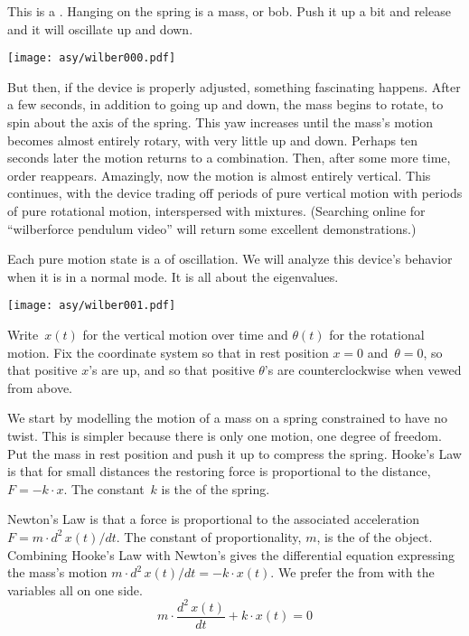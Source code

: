 
% 

This is a .
Hanging on the spring is a mass, or bob.
Push it up a bit and release and it will oscillate up and down.
\begin{center}
  \texttt{[image: asy/wilber000.pdf]}
\end{center}
But then, if the device is properly adjusted, something fascinating happens.
After a few seconds, in addition to going up
and down, the mass begins to rotate,
to spin about the axis of the spring.
This yaw increases until the mass's motion  
becomes almost entirely rotary, with very little up and down.
Perhaps ten seconds later the motion returns to a combination.
Then, after some more time, order reappears.
Amazingly, now
the motion is almost entirely vertical.
This continues, with the device trading off
periods of pure vertical motion with periods of pure rotational motion,
interspersed with mixtures. 
(Searching online for ``wilberforce pendulum video'' will return 
some excellent demonstrations.) 

Each pure motion state is a  of oscillation.
We will analyze this device's behavior when it is in a normal mode. 
It is all about the eigenvalues.

\begin{center}
  \texttt{[image: asy/wilber001.pdf]}
\end{center}

Write~$x(t)$ for the vertical motion over time and 
$\theta(t)$ for the rotational motion.
Fix the coordinate system so that in rest position $x=0$ and~$\theta=0$, 
so that positive $x$'s are up, and so that positive $\theta$'s
are counterclockwise when vewed from above.

We start by modelling the motion of a mass on a 
spring constrained to have no twist.
This is simpler because there is only one motion, one degree of freedom.
Put the mass in rest position and 
push it up to compress the spring.
Hooke's Law is that for small distances
the restoring force is 
proportional to the distance, $F=-k\cdot x$.
The constant~$k$ is the
 of the spring.

Newton's Law is that a force is proportional to the 
associated acceleration $F=m\cdot d^2\,x(t)/dt$.
The constant of proportionality, $m$, is the 
of the object.
Combining Hooke's Law with Newton's 
gives the differential equation expressing the 
mass's motion $m\cdot d^2\,x(t)/dt=-k\cdot x(t)$.
We prefer the from with the variables all on one side.
\begin{equation*}
  m\cdot \frac{d^2\,x(t)}{dt}+k\cdot x(t)=0
  \tag{$*$}
\end{equation*}

